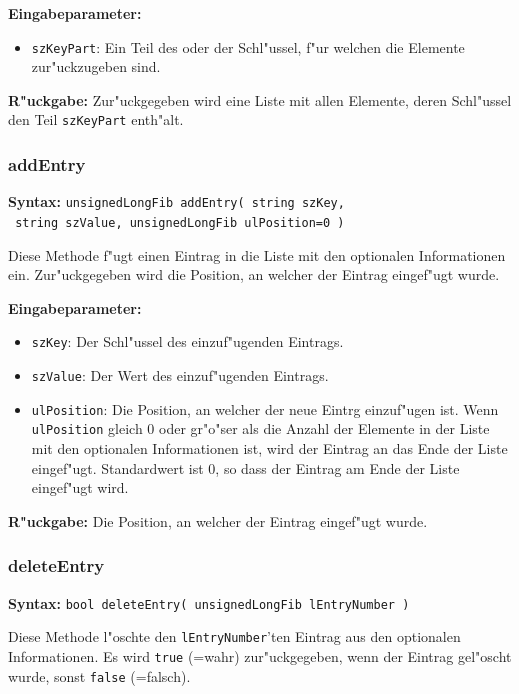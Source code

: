 \bigskip\noindent
\textbf{Eingabeparameter:}
\begin{itemize}
 \item \verb|szKeyPart|: Ein Teil des oder der Schl"ussel, f"ur welchen die Elemente zur"uckzugeben sind.
\end{itemize}

\bigskip\noindent
\textbf{R"uckgabe:} Zur"uckgegeben wird eine Liste mit allen Elemente, deren Schl"ussel den Teil \verb|szKeyPart| enth"alt.


\subsubsection{addEntry}

\textbf{Syntax:} \verb|unsignedLongFib addEntry( string szKey,| \\\verb| string szValue, unsignedLongFib ulPosition=0 )|

\bigskip\noindent
Diese Methode f"ugt einen Eintrag in die Liste mit den optionalen Informationen ein. Zur"uckgegeben wird die Position, an welcher der Eintrag eingef"ugt wurde.

\bigskip\noindent
\textbf{Eingabeparameter:}
\begin{itemize}
 \item \verb|szKey|: Der Schl"ussel des einzuf"ugenden Eintrags.
 \item \verb|szValue|: Der Wert des einzuf"ugenden Eintrags.
 \item \verb|ulPosition|: Die Position, an welcher der neue Eintrg einzuf"ugen ist. Wenn \verb|ulPosition| gleich $0$ oder gr"o"ser als die Anzahl der Elemente in der Liste mit den optionalen Informationen ist, wird der Eintrag an das Ende der Liste eingef"ugt. Standardwert ist $0$, so dass der Eintrag am Ende der Liste eingef"ugt wird.
\end{itemize}

\bigskip\noindent
\textbf{R"uckgabe:} Die Position, an welcher der Eintrag eingef"ugt wurde.


\subsubsection{deleteEntry}

\textbf{Syntax:} \verb|bool deleteEntry( unsignedLongFib lEntryNumber )|

\bigskip\noindent
Diese Methode l"oschte den \verb|lEntryNumber|'ten Eintrag aus den optionalen Informationen. Es wird \verb|true| (=wahr) zur"uckgegeben, wenn der Eintrag gel"oscht wurde, sonst \verb|false| (=falsch).

